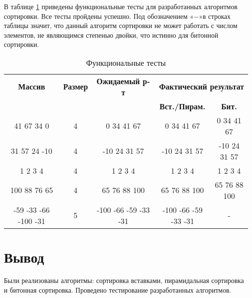 В таблице \ref{tbl:func_tests} приведены функциональные тесты для разработанных алгоритмов сортировки.
Все тесты пройдены успешно.
Под обозначением «$-$»\space в строках таблицы значит, что данный алгоритм сортировки не может работать с числом элементов, не являющимся степенью двойки, что истинно для битонной сортировки.

\begin{table}[ht]
	\small
	\begin{center}
		\begin{threeparttable}
		\caption{Функциональные тесты}
		\label{tbl:func_tests}
		\begin{tabular}{|c|c|c|c|c|}
			\hline
			\bfseries Массив
			& \bfseries Размер
			& \bfseries Ожидаемый р-т
			& \multicolumn{2}{c|}{\bfseries Фактический результат} \\ \cline{4-5}
			& & & \bfseries Вст./Пирам. & \bfseries Бит. \\
			\hline
			41 67 34 0 & 4 & 0 34 41 67 & 0 34 41 67 & 0 34 41 67 \\
			\hline
			31 57 24 -10 & 4 & -10 24 31 57 & -10 24 31 57 & -10 24 31 57 \\
			\hline
			1 2 3 4 & 4 & 1 2 3 4 & 1 2 3 4 & 1 2 3 4 \\
			\hline
			100 88 76 65 & 4 & 65 76 88 100 & 65 76 88 100 & 65 76 88 100 \\
			\hline
			-59 -33 -66 -100 -31 & 5 & -100 -66 -59 -33 -31 & -100 -66 -59 -33 -31 & - \\
			\hline
		\end{tabular}
		\end{threeparttable}
	\end{center}
\end{table}

\section*{Вывод}

Были реализованы алгоритмы: сортировка вставками, пирамидальная сортировка и битонная сортировка.
Проведено тестирование разработанных алгоритмов.
